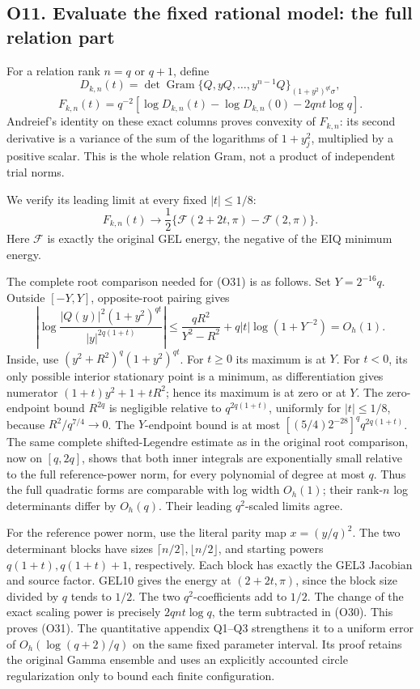 \documentclass[11pt,a4paper]{article}
\begin{document}
\subsection{O11. Evaluate the fixed rational model: the full relation
part}\label{sa:o11.-evaluate-the-fixed-rational-model-the-full-relation-part}

For a relation rank \(n=q\) or \(q+1\), define \[
D_{k,n}(t)=\det\operatorname{Gram}
\{Q,yQ,\ldots,y^{n-1}Q\}_{(1+y^2)^{qt}\sigma},
\] \[
F_{k,n}(t)=q^{-2}
\left[\log D_{k,n}(t)-\log D_{k,n}(0)-2qnt\log q\right].\tag{O30}
\] Andreief's identity on these exact columns proves convexity of
\(F_{k,n}\): its second derivative is a variance of the sum of the
logarithms of \(1+y_j^2\), multiplied by a positive scalar. This is the
whole relation Gram, not a product of independent trial norms.

We verify its leading limit at every fixed \(|t|\le1/8\): \[
\boxed{F_{k,n}(t)\longrightarrow
\frac12\{\mathcal F(2+2t,\pi)-\mathcal F(2,\pi)\}.}\tag{O31}
\] Here \(\mathcal F\) is exactly the original GEL energy, the negative
of the EIQ minimum energy.

The complete root comparison needed for (O31) is as follows. Set
\(Y=2^{-16}q\). Outside \([-Y,Y]\), opposite-root pairing gives \[
\left|\log\frac{|Q(y)|^2(1+y^2)^{qt}}
{|y|^{2q(1+t)}}\right|
\le \frac{qR^2}{Y^2-R^2}+q|t|\log(1+Y^{-2})=O_h(1).
\tag{O32}
\] Inside, use \((y^2+R^2)^q(1+y^2)^{qt}\). For \(t\ge0\) its maximum is
at \(Y\). For \(t<0\), its only possible interior stationary point is a
minimum, as differentiation gives numerator \((1+t)y^2+1+tR^2\); hence
its maximum is at zero or at \(Y\). The zero-endpoint bound \(R^{2q}\)
is negligible relative to \(q^{2q(1+t)}\), uniformly for \(|t|\le1/8\),
because \(R^2/q^{7/4}\to0\). The \(Y\)-endpoint bound is at most
\([(5/4)2^{-28}]^q q^{2q(1+t)}\). The same complete shifted-Legendre
estimate as in the original root comparison, now on \([q,2q]\), shows
that both inner integrals are exponentially small relative to the full
reference-power norm, for every polynomial of degree at most \(q\). Thus
the full quadratic forms are comparable with log width \(O_h(1)\); their
rank-\(n\) log determinants differ by \(O_h(q)\). Their leading
\(q^2\)-scaled limits agree.

For the reference power norm, use the literal parity map \(x=(y/q)^2\).
The two determinant blocks have sizes
\(\lceil n/2\rceil,\lfloor n/2\rfloor\), and starting powers
\(q(1+t),q(1+t)+1\), respectively. Each block has exactly the GEL3
Jacobian and source factor. GEL10 gives the energy at \((2+2t,\pi)\),
since the block size divided by \(q\) tends to \(1/2\). The two
\(q^2\)-coefficients add to \(1/2\). The change of the exact scaling
power is precisely \(2qnt\log q\), the term subtracted in (O30). This
proves (O31). The quantitative appendix Q1--Q3 strengthens it to a
uniform error of \(O_h(\log(q+2)/q)\) on the same fixed parameter
interval. Its proof retains the original Gamma ensemble and uses an
explicitly accounted circle regularization only to bound each finite
configuration.
\end{document}
